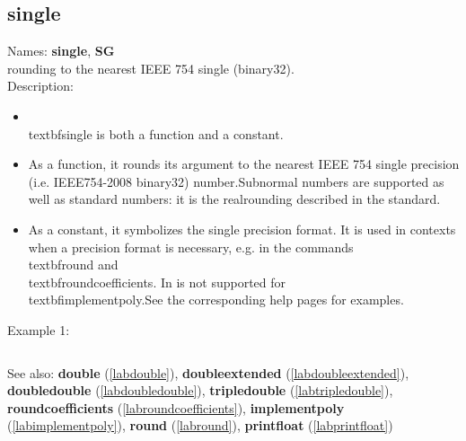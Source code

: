 \subsection{single}
\label{labsingle}
\noindent Names: \textbf{single}, \textbf{SG}\\
rounding to the nearest IEEE 754 single (binary32).\\
\noindent Description: \begin{itemize}

\item \\textbf{single} is both a function and a constant.\n
\item As a function, it rounds its argument to the nearest IEEE 754 single precision (i.e. IEEE754-2008 binary32) number.\n   Subnormal numbers are supported as well as standard numbers: it is the real\n   rounding described in the standard.\n
\item As a constant, it symbolizes the single precision format. It is used in \n   contexts when a precision format is necessary, e.g. in the commands \n   \\textbf{round} and \\textbf{roundcoefficients}. In is not supported for \\textbf{implementpoly}.\n   See the corresponding help pages for examples.\n\end{itemize}
\noindent Example 1: 
\begin{center}\begin{minipage}{15cm}\begin{Verbatim}[frame=single]
\end{Verbatim}
\end{minipage}\end{center}
See also: \textbf{double} (\ref{labdouble}), \textbf{doubleextended} (\ref{labdoubleextended}), \textbf{doubledouble} (\ref{labdoubledouble}), \textbf{tripledouble} (\ref{labtripledouble}), \textbf{roundcoefficients} (\ref{labroundcoefficients}), \textbf{implementpoly} (\ref{labimplementpoly}), \textbf{round} (\ref{labround}), \textbf{printfloat} (\ref{labprintfloat})
